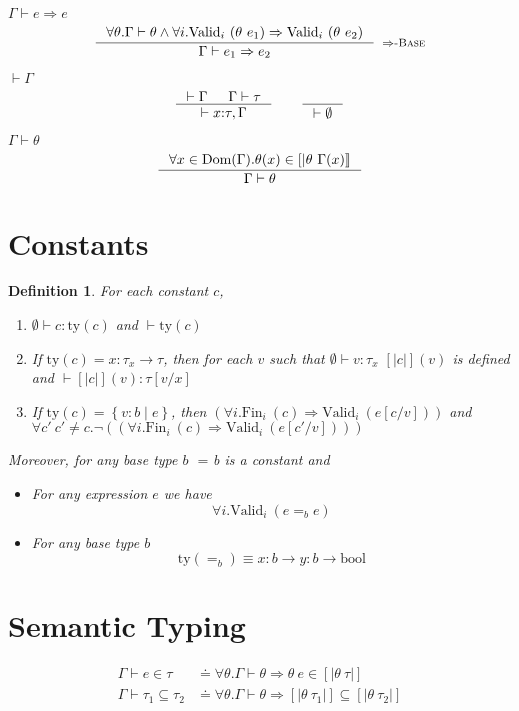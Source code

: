 \documentclass[10pt,a4paper]{article}
\newtheorem{definition}{Definition}
\newcommand\rulename[1]{\textsc{#1}\xspace}
\newcommand\rimpl{\ensuremath{\Rightarrow}\rulename{-Base}}
\newcommand\tbool{\ensuremath{\text{bool}}}
\newcommand\tref[3]{\ensuremath{\left\lbrace #1 \colon #2 \mid #3 \right\rbrace}}
\newcommand\tfun[3]{\ensuremath{#1\colon #2 \rightarrow #3}}
\newcommand\eqb[1]{\ensuremath{=_{#1}}}
\newcommand\eq{\eqb{}}
\newcommand\validi[1]{\ensuremath{\text{Valid}_{i}\ (#1)}}
\newcommand\fini[1]{\ensuremath{\text{Fin}_{i}\ (#1)}}
\newcommand\generalconditionInterp[2]
	{\ensuremath{(\forall i. \fini{#1} \Rightarrow \validi{#2})}}
\newcommand\generalconditionImpl[2]
	{\ensuremath{\forall i . \validi{#1} \Rightarrow \validi{#2}}}
\newcommand\generalconditionImplOne[1]
	{\ensuremath{\forall i . \validi{#1}}}
\newcommand\ty[1]{\ensuremath{\text{ty}({#1})}}
\newcommand\sub[2]{\ensuremath{\left[ #2 / #1 \right]}}
\newcommand\interp[1]{\ensuremath{[|#1|]}}
\newcommand\hastype[3]{\ensuremath{#1 \vdash #2 \colon #3}}
\newcommand\shastype[3]{\ensuremath{#1 \vdash #2 \in #3}}
\newcommand\iswellformed[2]{\ensuremath{#1 \vdash #2}}
\newcommand\sissubtype[3]{\ensuremath{#1 \vdash #2 \subseteq #3}}
\newcommand\issubref[3]{\ensuremath{#1 \vdash #2 \Rightarrow #3}}
\begin{document}
\hfill\mbox{\issubref{\Gamma}{e}{e}}
$$
\inference{
	\forall \theta. \iswellformed{\Gamma}{\theta} \land
	\generalconditionImpl{\theta\ e_1}{\theta\ e_2}
}{
	\issubref{\Gamma}{e_1}{e_2}
}[\rimpl]
$$

\hfill\mbox{\iswellformed{}{\Gamma}}
$$
\inference{
	\iswellformed{}{\Gamma} &&
	\iswellformed{\Gamma}{\tau}
}{
	\iswellformed{}{x\colon\tau,\Gamma}
}
\qquad
\inference{}{\iswellformed{}{\emptyset}}
$$


\hfill\mbox{\iswellformed{\Gamma}{\theta}}
$$
\inference{
	\forall x \in \text{Dom}(\Gamma). 
	\theta(x) \in \interp{\theta \ \Gamma(x)}
}{
	\iswellformed{\Gamma}{\theta}
}
$$


\section*{Constants}
\begin{definition}\label{def:constants}
For each constant $c$, 
\begin{enumerate}
\item \hastype{\emptyset}{c}{\ty{c}} and \iswellformed{}{\ty{c}}
\item If $\ty{c} = \tfun{x}{\tau_x}{\tau}$, then for each $v$ such that
\hastype{\emptyset}{v}{\tau_x} $\interp{c}(v)$ is defined and
\hastype{}{\interp{c}(v)}{\tau\sub{x}{v}}
\item If $\ty{c} = \tref{v}{b}{e}$, 
then \generalconditionInterp{c}{e\sub{v}{c}} and 
$\forall c'\ c' \neq c. \lnot (\generalconditionInterp{c}{e\sub{v}{c'}})$ 
\end{enumerate}
Moreover, for any base type $b$ \eq{b} is a constant and 
\begin{itemize}
\item For any expression $e$ we have 
$$\generalconditionImplOne{e \eqb{b} e}$$
\item For any base type $b$ 
$$\ty{=_b} \equiv \tfun{x}{b}{\tfun{y}{b}{\tbool}}$$
\end{itemize}
\end{definition}

\section*{Semantic Typing}
\begin{align*}
\shastype{\Gamma}{e}{\tau} & \doteq
	\forall \theta . \iswellformed{\Gamma}{\theta} \Rightarrow \theta\ e \in \interp{\theta \ \tau}\\
\sissubtype{\Gamma}{\tau_1}{\tau_2} & \doteq 
	\forall \theta . \iswellformed{\Gamma}{\theta} \Rightarrow \interp{\theta\ \tau_1} \subseteq \interp{\theta\ \tau_2}
\end{align*}
\end{document}
